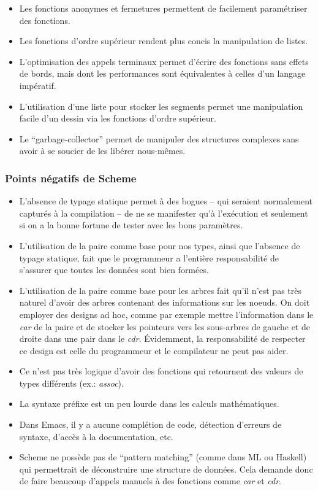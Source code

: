 \documentclass[10pt]{report}
\begin{document}
\begin{itemize}
\item Les fonctions anonymes et fermetures permettent de facilement
  paramétriser des fonctions.
\item Les fonctions d'ordre supérieur rendent plus concis la
  manipulation de listes.
\item L'optimisation des appels terminaux permet d'écrire des
  fonctions sans effets de bords, mais dont les performances sont
  équivalentes à celles d'un langage impératif.
\item L'utilisation d'une liste pour stocker les segments permet une
  manipulation facile d'un dessin via les fonctions d'ordre supérieur.
\item Le ``garbage-collector'' permet de manipuler des structures
  complexes sans avoir à se soucier de les libérer nous-mêmes.
\end{itemize}

\subsubsection{Points négatifs de Scheme}
\begin{itemize}
\item L'absence de typage statique permet à des bogues -- qui seraient
  normalement capturés à la compilation -- de ne se manifester qu'à
  l'exécution et seulement si on a la bonne fortune de tester avec les
  bons paramètres.
\item L'utilisation de la paire comme base pour nos types, ainsi que
  l'absence de typage statique, fait que le programmeur a l'entière
  responsabilité de s'assurer que toutes les données sont bien
  formées.
\item L'utilisation de la paire comme base pour les arbres fait qu'il
  n'est pas très naturel d'avoir des arbres contenant des informations
  sur les noeuds.  On doit employer des designs ad hoc, comme par
  exemple mettre l'information dans le \emph{car} de la paire et de
  stocker les pointeurs vers les sous-arbres de gauche et de droite
  dans une pair dans le \emph{cdr}.  Évidemment, la responsabilité de
  respecter ce design est celle du programmeur et le compilateur ne
  peut pas aider.
\item Ce n'est pas très logique d'avoir des fonctions qui retournent
  des valeurs de types différents (ex.: \emph{assoc}).
\item La syntaxe préfixe est un peu lourde dans les calculs
  mathématiques.
\item Dans Emacs, il y a aucune complétion de code, détection
  d'erreurs de syntaxe, d'accès à la documentation, etc.
\item Scheme ne possède pas de ``pattern matching'' (comme dans ML ou
  Haskell) qui permettrait de déconstruire une structure de données.
  Cela demande donc de faire beaucoup d'appels manuels à des fonctions
  comme \emph{car} et \emph{cdr}.
\end{itemize}
\end{document}
